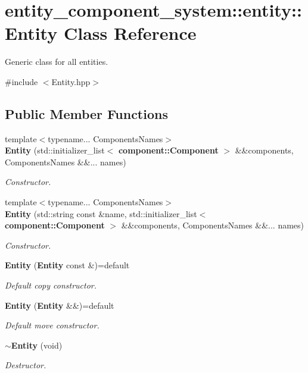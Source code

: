 \section{entity\+\_\+component\+\_\+system\+:\+:entity\+:\+:Entity Class Reference}
\label{classentity__component__system_1_1entity_1_1_entity}


Generic class for all entities.  




{\ttfamily \#include $<$Entity.\+hpp$>$}

\subsection*{Public Member Functions}
\begin{DoxyCompactItemize}
\item 
{\footnotesize template$<$typename... Components\+Names$>$ }\\{\bf Entity} (std\+::initializer\+\_\+list$<$ {\bf component\+::\+Component} $>$ \&\&components, Components\+Names \&\&... names)
\begin{DoxyCompactList}\small\item\em Constructor. \end{DoxyCompactList}\item 
{\footnotesize template$<$typename... Components\+Names$>$ }\\{\bf Entity} (std\+::string const \&name, std\+::initializer\+\_\+list$<$ {\bf component\+::\+Component} $>$ \&\&components, Components\+Names \&\&... names)
\begin{DoxyCompactList}\small\item\em Constructor. \end{DoxyCompactList}\item 
{\bf Entity} ({\bf Entity} const \&)=default
\begin{DoxyCompactList}\small\item\em Default copy constructor. \end{DoxyCompactList}\item 
{\bf Entity} ({\bf Entity} \&\&)=default
\begin{DoxyCompactList}\small\item\em Default move constructor. \end{DoxyCompactList}\item 
{\bf $\sim$\+Entity} (void)
\begin{DoxyCompactList}\small\item\em Destructor. \end{DoxyCompactList}\item 

\end{DoxyCompactItemize}
